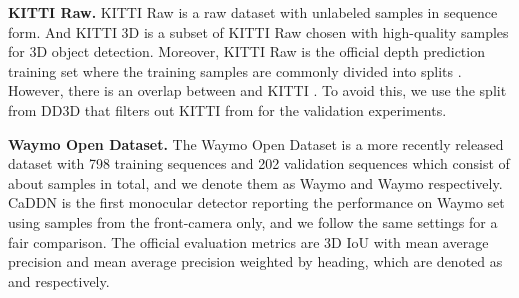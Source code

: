 \documentclass[runningheads]{llncs}
\begin{document}
\noindent\textbf{KITTI Raw.}
KITTI Raw \cite{KITTIRaw} is a raw dataset with  unlabeled samples in sequence form. 
And KITTI 3D is a subset of KITTI Raw chosen with high-quality samples for 3D object detection.
Moreover, KITTI Raw is the official depth prediction training set where the training samples are commonly divided into  splits \cite{eigensplit}.
However, there is an overlap \cite{arewemissing,PL} between  and KITTI .
To avoid this, we use the  split from DD3D \cite{dd3d} that filters out KITTI  from  for the validation experiments.



\noindent\textbf{Waymo Open Dataset.}
The Waymo Open Dataset \cite{Waymo} is a more recently released dataset with 798 training sequences and 202 validation sequences which consist of about  samples in total, and we denote them as Waymo  and Waymo  respectively.
CaDDN \cite{CADDN} is the first monocular detector reporting the performance on Waymo  set using samples from the front-camera only, and we follow the same settings for a fair comparison.
The official evaluation metrics are 3D IoU with mean average precision and mean average precision weighted by heading, which are denoted as  and  respectively.
\end{document}
